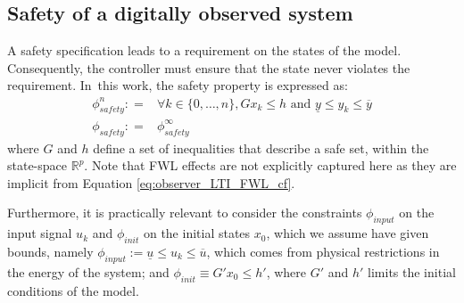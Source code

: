 \documentclass[sigconf]{llncs}
\newcommand{\mat}[1]{{#1}}
\renewcommand{\vec}[1]{{#1}}
\begin{document}
\subsection{Safety of a digitally observed system}\label{sec:cof_safety}

A safety specification leads to a requirement on the states of the model. 
Consequently, the controller must ensure that the state never violates the
requirement.  In~this work, the safety property is expressed as:
%
\begin{align}
\phi_\mathit{safety}^n: = & \forall k \in \{0, \ldots , n\},
  \mat{G}\vec{x}_k \leq \vec{h} \text{ and } \underline{y} \leq y_k \leq \overline{y}\nonumber\\
\phi_\mathit{safety}: = & \phi_\mathit{safety}^\infty
\label{eq:safetyspec}
\end{align}
%
where $\mat{G}$ and $\vec{h}$ define a set of inequalities that describe 
a safe set, within the state-space $\mathbb{R}^p$.
%
Note that FWL effects are not explicitly captured here
as they are implicit from Equation \eqref{eq:observer_LTI_FWL_cf}.

Furthermore, it is practically relevant to consider the constraints
$\phi_\mathit{input}$ on the input signal $u_{k}$ and $\phi_\mathit{init}$
on the initial states $x_0$, which we assume have given bounds, namely
$\phi_\mathit{input} := \underline{u} \leq u_k \leq \overline{u}$, which
comes from physical restrictions in the energy of the system; and
$\phi_\mathit{init}\equiv \mat{G}' \vec{x}_0 \leq \vec{h}'$, where
$\mat{G}'$ and $\vec{h}'$ limits the initial conditions of the model.

%
%
\end{document}
